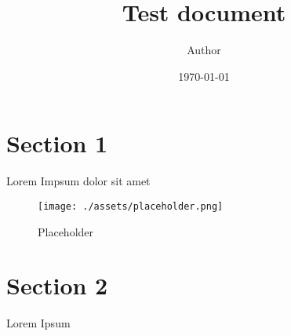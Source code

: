 \documentclass[11pt]{article}
\title{ Test document}
\author{ Author }
\date{\today}
\begin{document}
\maketitle
\pagebreak

\tableofcontents
\pagebreak


\section{Section 1}

Lorem Impsum dolor sit amet
\begin{figure}[h]
    \centering
    \texttt{[image: ./assets/placeholder.png]}
    \caption{Placeholder}
\end{figure}

\pagebreak
\section{Section 2}
Lorem Ipsum \\

\end{document}
